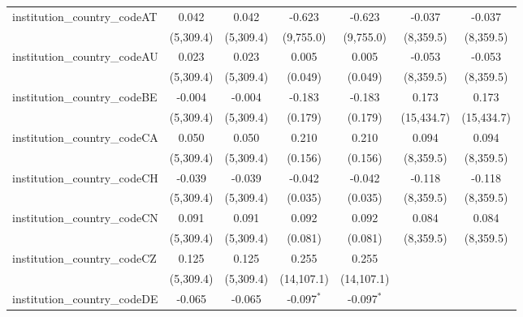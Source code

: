 \begin{tabular}{lcccccc}
   institution\_country\_codeAT          & 0.042         & 0.042         & -0.623         & -0.623         & -0.037         & -0.037\\   
                                         & (5,309.4)     & (5,309.4)     & (9,755.0)      & (9,755.0)      & (8,359.5)      & (8,359.5)\\   
   institution\_country\_codeAU          & 0.023         & 0.023         & 0.005          & 0.005          & -0.053         & -0.053\\   
                                         & (5,309.4)     & (5,309.4)     & (0.049)        & (0.049)        & (8,359.5)      & (8,359.5)\\   
   institution\_country\_codeBE          & -0.004        & -0.004        & -0.183         & -0.183         & 0.173          & 0.173\\   
                                         & (5,309.4)     & (5,309.4)     & (0.179)        & (0.179)        & (15,434.7)     & (15,434.7)\\   
   institution\_country\_codeCA          & 0.050         & 0.050         & 0.210          & 0.210          & 0.094          & 0.094\\   
                                         & (5,309.4)     & (5,309.4)     & (0.156)        & (0.156)        & (8,359.5)      & (8,359.5)\\   
   institution\_country\_codeCH          & -0.039        & -0.039        & -0.042         & -0.042         & -0.118         & -0.118\\   
                                         & (5,309.4)     & (5,309.4)     & (0.035)        & (0.035)        & (8,359.5)      & (8,359.5)\\   
   institution\_country\_codeCN          & 0.091         & 0.091         & 0.092          & 0.092          & 0.084          & 0.084\\   
                                         & (5,309.4)     & (5,309.4)     & (0.081)        & (0.081)        & (8,359.5)      & (8,359.5)\\   
   institution\_country\_codeCZ          & 0.125         & 0.125         & 0.255          & 0.255          &                &   \\   
                                         & (5,309.4)     & (5,309.4)     & (14,107.1)     & (14,107.1)     &                &   \\   
   institution\_country\_codeDE          & -0.065        & -0.065        & -0.097$^{*}$   & -0.097$^{*}$   &                &   \\   

\end{tabular}
